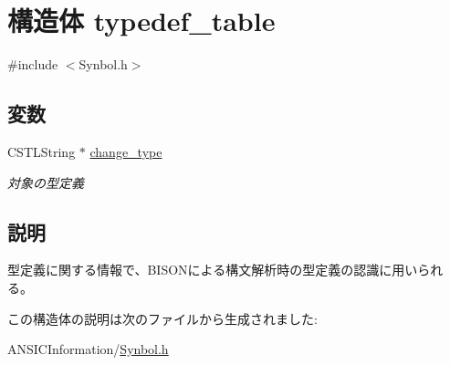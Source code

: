 \section{構造体 typedef\_\-table}
\label{structtypedef__table}


{\ttfamily \#include $<$Synbol.h$>$}

\subsection*{変数}
\begin{DoxyCompactItemize}
\item 
CSTLString $\ast$ \hyperlink{structtypedef__table_a4afc97b97fbd4fc47fdc746bfce061f2}{change\_\-type}\label{structtypedef__table_a4afc97b97fbd4fc47fdc746bfce061f2}

\begin{DoxyCompactList}\small\item\em 対象の型定義 \item\end{DoxyCompactList}\end{DoxyCompactItemize}


\subsection{説明}
型定義に関する情報で、BISONによる構文解析時の型定義の認識に用いられる。 

この構造体の説明は次のファイルから生成されました:\begin{DoxyCompactItemize}
\item 
ANSICInformation/\hyperlink{Synbol_8h}{Synbol.h}\end{DoxyCompactItemize}
